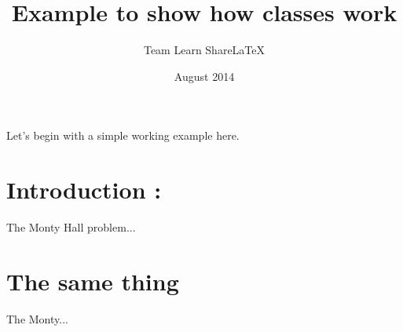 \documentclass[red]{exaclass}
\title{Example to show how classes work}
\author{Team Learn ShareLaTeX}
\date{August 2014}
\begin{document}
\maketitle

\noindent
Let's begin with a simple working example here.

\blindtext

\section{Introduction : \test}

The Monty Hall problem...

\section{The same thing}

The Monty...
\end{document}
